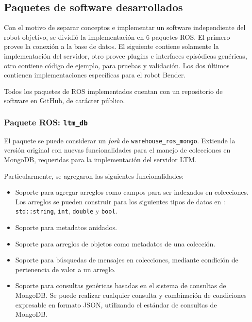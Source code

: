 \subsection{Paquetes de software desarrollados}\label{sec:impl_packages}

Con el motivo de separar conceptos e implementar un software independiente del robot objetivo, se dividió la implementación en 6 paquetes ROS. El primero provee la conexión a la base de datos. El siguiente contiene solamente la implementación del servidor, otro provee plugins e interfaces episódicas genéricas, otro contiene código de ejemplo, para pruebas y validación. Los dos últimos contienen implementaciones específicas para el robot Bender.

Todos los paquetes de ROS implementados cuentan con un repositorio de software en GitHub, de carácter público.

\subsubsection{Paquete ROS: \texttt{ltm\_db}}

El paquete se puede considerar un \textit{fork} de \texttt{warehouse\_ros\_mongo}. Extiende la versión original con nuevas funcionalidades para el manejo de colecciones en MongoDB, requeridas para la implementación del servidor LTM.

Particularmente, se agregaron las siguientes funcionalidades:
\begin{itemize}
\item Soporte para agregar arreglos como campos para ser indexados en colecciones. Los arreglos se pueden construir para los siguientes tipos de datos en \CC: \texttt{std::string}, \texttt{int}, \texttt{double} y \texttt{bool}. 
\item Soporte para metadatos anidados.
\item Soporte para arreglos de objetos como metadatos de una colección.
\item Soporte para búsquedas de mensajes en colecciones, mediante condición de pertenencia de valor a un arreglo.
\item Soporte para consultas genéricas basadas en el sistema de consultas de MongoDB. Se puede realizar cualquier consulta y combinación de condiciones expresable en formato JSON, utilizando el estándar de consultas de MongoDB.
\end{itemize}

